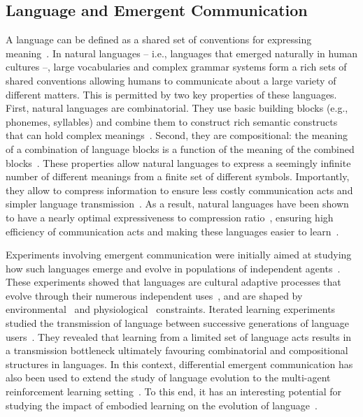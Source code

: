 \subsection{Language and Emergent Communication}\label{sec:LAMAC:RW_LanguageDef}

A language can be defined as a shared set of conventions for expressing meaning~\citep{Pinker1990_NaturalLang, Steels1995_SelfOrgVoc}. In natural languages -- i.e., languages that emerged naturally in human cultures --, large vocabularies and complex grammar systems form a rich sets of shared conventions allowing humans to communicate about a large variety of different matters. This is permitted by two key properties of these languages. First, natural languages are combinatorial. They use basic building blocks (e.g., phonemes, syllables) and combine them to construct rich semantic constructs that can hold complex meanings~\citep{Zuidema2018_Combinatorial}. Second, they are compositional: the meaning of a combination of language blocks is a function of the meaning of the combined blocks~\citep{Smith2003_CompoEmerg}. These properties allow natural languages to express a seemingly infinite number of different meanings from a finite set of different symbols. Importantly, they allow to compress information to ensure less costly communication acts and simpler language transmission~\citep{Sigurd2004_ZipfRevisit, Gibson2019_EfficiencyShapeLang}. As a result, natural languages have been shown to have a nearly optimal expressiveness to compression ratio~\citep{Kirby2015_CompressionComm, Gibson2019_EfficiencyShapeLang}, ensuring high efficiency of communication acts and making these languages easier to learn~\citep{Carr2016_CulturalEvoLang}. 

    Experiments involving emergent communication were initially aimed at studying how such languages emerge and evolve in populations of independent agents~\citep{Steels1995_SelfOrgVoc, Nowak1999_LanguageEvo, Vogt2005_EmergenceCompo, Brighton2005_LanguageAsEvo, Kirby2015_CompressionComm}. These experiments showed that languages are cultural adaptive processes that evolve through their numerous independent uses~\citep{Steels1995_SelfOrgVoc, Kirby2015_CompressionComm, Christiansen2008_BrainShapeLang}, and are shaped by environmental~\citep{Perfors2014_WorldShapeLang} and physiological~\citep{Christiansen2008_BrainShapeLang} constraints. Iterated learning experiments studied the transmission of language between successive generations of language users~\citep{Smith2003_IteratedLearning, Vogt2005_EmergenceCompo, Kirby2015_CompressionComm}. They revealed that learning from a limited set of language acts results in a transmission bottleneck ultimately favouring combinatorial and compositional structures in languages. In this context, differential emergent communication has also been used to extend the study of language evolution to the multi-agent reinforcement learning setting~\citep{Havrylov2017_EmergenceLang, Kottur2017_NaturLangEmerg, Lazaridou2017_EmergNaturalLang, Chaabouni2019_AntiEfficient, Rita2022_PopHetero}. To this end, it has an interesting potential for studying the impact of embodied learning on the evolution of language~\citep{VanEecke2022_LangGameMARL}.

